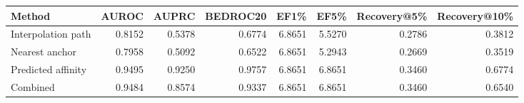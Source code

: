 \begin{tabular}{lrrrrrrr}
\toprule
Method & AUROC & AUPRC & BEDROC20 & EF1\% & EF5\% & Recovery@5\% & Recovery@10\% \\
\midrule
Interpolation path & 0.8152 & 0.5378 & 0.6774 & 6.8651 & 5.5270 & 0.2786 & 0.3812 \\
Nearest anchor & 0.7958 & 0.5092 & 0.6522 & 6.8651 & 5.2943 & 0.2669 & 0.3519 \\
Predicted affinity & 0.9495 & 0.9250 & 0.9757 & 6.8651 & 6.8651 & 0.3460 & 0.6774 \\
Combined & 0.9484 & 0.8574 & 0.9337 & 6.8651 & 6.8651 & 0.3460 & 0.6540 \\
\bottomrule
\end{tabular}
